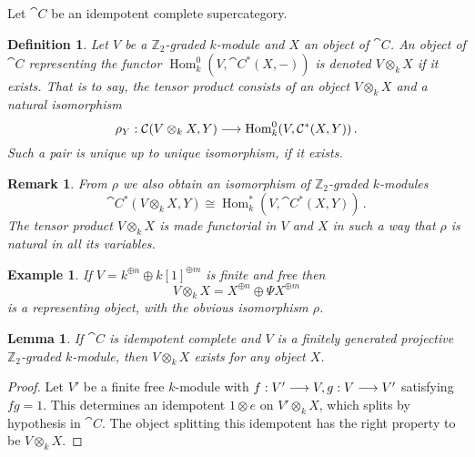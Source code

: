 \documentclass[english,letter paper,12pt,leqno]{article}
\newtheorem{lemma}[theorem]{Lemma}
\theoremstyle{example}
\newtheorem{definition}[theorem]{Definition}
\newtheorem{example}[theorem]{Example}
\newtheorem{remark}[theorem]{Remark}
\numberwithin{equation}{section}
\def\Hom{\operatorname{Hom}}
\begin{document}
Let $\cat{C}$ be an idempotent complete supercategory.

\begin{definition} Let $V$ be a $\mathbb{Z}_2$-graded $k$-module and $X$ an object of $\cat{C}$. An object of $\cat{C}$ representing the functor $\Hom^0_k( V, \cat{C}^*(X, -))$ is denoted $V \otimes_k X$ if it exists. That is to say, the tensor product consists of an object $V \otimes_k X$ and a natural isomorphism
\[
\rho_Y: \cat{C}( V \otimes_k X, Y ) \lto \Hom^0_k( V, \cat{C}^*(X,Y) )\,.
\]
Such a pair is unique up to unique isomorphism, if it exists.
\end{definition}

\begin{remark} 
From $\rho$ we also obtain an isomorphism of $\mathbb{Z}_2$-graded $k$-modules
\[
\cat{C}^*( V \otimes_k X, Y ) \cong \Hom_k^*( V, \cat{C}^*(X,Y) )\,.
\]
The tensor product $V \otimes_k X$ is made functorial in $V$ and $X$ in such a way that $\rho$ is natural in all its variables.
\end{remark}

\begin{example} If $V = k^{\oplus n} \oplus k[1]^{\oplus m}$ is finite and free then
\[
V \otimes_k X = X^{\oplus n} \oplus \Psi X ^{\oplus m}
\]
is a representing object, with the obvious isomorphism $\rho$.
\end{example}

\begin{lemma} If $\cat{C}$ is idempotent complete and $V$ is a finitely generated projective $\mathbb{Z}_2$-graded $k$-module, then $V \otimes_k X$ exists for any object $X$.
\end{lemma}
\begin{proof}
Let $V'$ be a finite free $k$-module with $f: V' \longrightarrow V, g: V \longrightarrow V'$ satisfying $fg = 1$. This determines an idempotent $1 \otimes e$ on $V' \otimes_k X$, which splits by hypothesis in $\cat{C}$. The object splitting this idempotent has the right property to be $V \otimes_k X$.
\end{proof}
\end{document}
